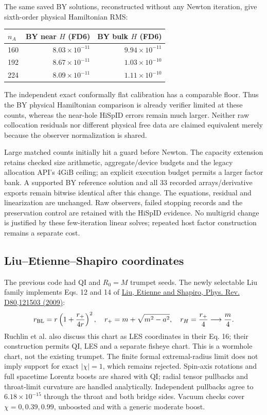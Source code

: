 \documentclass[aps,prd,preprint,notitlepage,nofootinbib]{revtex4-2}
\begin{document}
The same saved BY solutions, reconstructed without any Newton iteration,
give sixth-order physical Hamiltonian RMS:
\begin{center}\footnotesize
\begin{tabular}{@{}lrr@{}}\toprule
$n_A$ & BY near $H$ (FD6) & BY bulk $H$ (FD6)\\\midrule
160 & $8.03\times10^{-11}$ & $9.94\times10^{-11}$\\
192 & $8.67\times10^{-11}$ & $1.03\times10^{-10}$\\
224 & $8.09\times10^{-11}$ & $1.11\times10^{-10}$\\\bottomrule
\end{tabular}\end{center}
The independent exact conformally flat calibration has a comparable floor.
Thus the BY physical Hamiltonian comparison is already verifier limited at
these counts, whereas the near-hole HiSpID errors remain much larger.
Neither raw collocation residuals nor different physical free data are
claimed equivalent merely because the observer normalization is shared.

Large matched counts initially hit a guard before Newton. The capacity
extension retains checked size arithmetic, aggregate/device budgets and the
legacy allocation API's 4GiB ceiling; an explicit execution budget permits a
larger factor bank. A supported BY reference solution and all 33 recorded
arrays/derivative exports remain bitwise identical after this change.
The equations, residual and linearization are unchanged. Raw observers,
failed stopping records and the preservation control are retained with the
HiSpID evidence. No multigrid change is justified by these few-iteration
linear solves; repeated host factor construction remains a separate cost.

\subsection{Liu--Etienne--Shapiro coordinates}
The previous code had QI and $R_0=M$ trumpet seeds. The newly selectable
Liu family implements Eqs. 12 and 14 of
\href{https://arxiv.org/abs/1001.4077}{Liu, Etienne and Shapiro,
Phys. Rev. D80,121503 (2009)}:
\[
 r_{\rm BL}=r\left(1+\frac{r_+}{4r}\right)^2,\quad
 r_+=m+\sqrt{m^2-a^2},\quad r_H=\frac{r_+}{4}\longrightarrow\frac m4.
\]
Ruchlin et al. also discuss this chart as LES coordinates in their Eq. 16;
their construction permits QI, LES and a separate fisheye chart. This is a
wormhole chart, not the existing trumpet. The finite formal
extremal-radius limit does not imply support for exact $|\chi|=1$, which
remains rejected. Spin-axis rotations and full spacetime Lorentz boosts are
shared with QI; radial tensor pullbacks and throat-limit curvature are
handled analytically. Independent pullbacks agree to $6.18\times10^{-15}$
through the throat and both bridge sides. Vacuum checks cover
$\chi=0,0.39,0.99$, unboosted and with a generic moderate boost.
\end{document}
